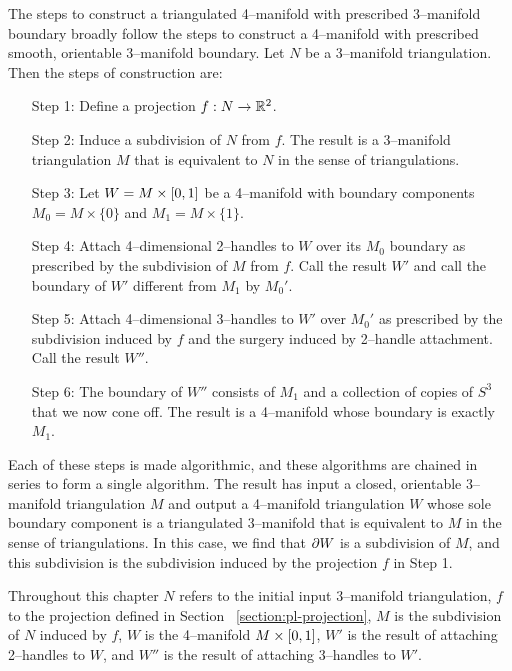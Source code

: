 \label{chapter:triangulation}

The steps to construct a triangulated 4--manifold with prescribed 3--manifold boundary broadly follow the steps to construct a 4--manifold with prescribed smooth, orientable 3--manifold boundary.
Let $N$ be a 3--manifold triangulation.
Then the steps of construction are:
\begin{enumerate}
	\item[Step 1:] Define a projection $f:N\to\mathbb{R}^2$.
	
	\item[Step 2:] Induce a subdivision of $N$ from $f$.  The result is a 3--manifold triangulation $M$ that is equivalent to $N$ in the sense of triangulations.

	\item[Step 3:] Let $W=M\times[0,1]$ be a 4--manifold with boundary components $M_0 = M\times\{0\}$ and $M_1 = M\times\{1\}$.
	
	\item[Step 4:] Attach 4--dimensional 2--handles to $W$ over its $M_0$ boundary as prescribed by the subdivision of $M$ from $f$.  Call the result $W'$ and call the boundary of $W'$ different from $M_1$ by $M_0'$.
	
	\item[Step 5:] Attach 4--dimensional 3--handles to $W'$ over $M_0'$ as prescribed by the subdivision induced by $f$ and the surgery induced by 2--handle attachment.  Call the result $W''$.
	
	\item[Step 6:] The boundary of $W''$ consists of $M_1$ and a collection of copies of $S^3$ that we now cone off.  The result is a 4--manifold whose boundary is exactly $M_1$.
\end{enumerate}

Each of these steps is made algorithmic, and these algorithms are chained in series to form a single algorithm.
The result has input a closed, orientable 3--manifold triangulation $M$ and output a 4--manifold triangulation $W$ whose sole boundary component is a triangulated 3--manifold that is equivalent to $M$ in the sense of triangulations.
In this case, we find that $\partial W$ is a subdivision of $M$, and this subdivision is the subdivision induced by the projection $f$ in Step 1.

Throughout this chapter $N$ refers to the initial input 3--manifold triangulation, $f$ to the projection defined in Section ~\ref{section:pl-projection}, $M$ is the subdivision of $N$ induced by $f$, $W$ is the 4--manifold $M\times[0,1]$, $W'$ is the result of attaching 2--handles to $W$, and $W''$ is the result of attaching 3--handles to $W'$.













